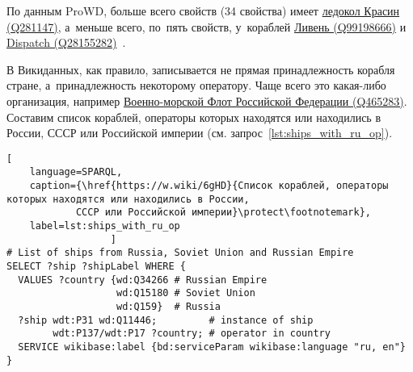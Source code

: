 \newpage
По данным ProWD, больше всего свойств (34 свойства) имеет 
\href{https://www.wikidata.org/wiki/Q281147}{ледокол Красин (Q281147)}, 
а~меньше всего, по~пять свойств, у~кораблей 
\href{https://www.wikidata.org/wiki/Q99198666}{Ливень (Q99198666)} и 
\href{https://www.wikidata.org/wiki/Q28155282}{Dispatch (Q28155282)}~\autocite{ProWD_ru_ships}.

В Викиданных, как правило, записывается не прямая принадлежность корабля стране, 
а~принадлежность некоторому оператору. 
Чаще всего это какая-либо организация, 
например 
\href{https://www.wikidata.org/wiki/Q465283}{Военно-морской Флот Российской Федерации (Q465283)}. 
Составим список кораблей, 
операторы которых находятся или находились в России, СССР или Российской империи 
(см. запрос~\ref{lst:ships_with_ru_op}). 



\begin{lstlisting}[ 
    language=SPARQL, 
    caption={\href{https://w.wiki/6gHD}{Cписок кораблей, операторы которых находятся или находились в России, 
            СССР или Российской империи}\protect\footnotemark}, 
    label=lst:ships_with_ru_op 
                  ]
# List of ships from Russia, Soviet Union and Russian Empire
SELECT ?ship ?shipLabel WHERE {
  VALUES ?country {wd:Q34266 # Russian Empire
                   wd:Q15180 # Soviet Union
                   wd:Q159}  # Russia
  ?ship wdt:P31 wd:Q11446;         # instance of ship
        wdt:P137/wdt:P17 ?country; # operator in country
  SERVICE wikibase:label {bd:serviceParam wikibase:language "ru, en"}
}
\end{lstlisting}


